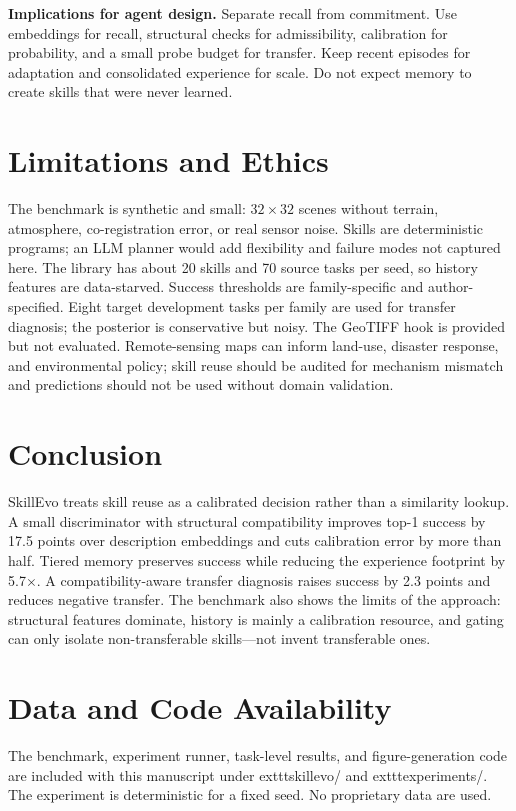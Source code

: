 \documentclass[journal]{IEEEtran}
\begin{document}
\textbf{Implications for agent design.} Separate recall from commitment. Use embeddings for recall, structural checks for admissibility, calibration for probability, and a small probe budget for transfer. Keep recent episodes for adaptation and consolidated experience for scale. Do not expect memory to create skills that were never learned.

\section{Limitations and Ethics}

The benchmark is synthetic and small: $32\times32$ scenes without terrain, atmosphere, co-registration error, or real sensor noise. Skills are deterministic programs; an LLM planner would add flexibility and failure modes not captured here. The library has about 20 skills and 70 source tasks per seed, so history features are data-starved. Success thresholds are family-specific and author-specified. Eight target development tasks per family are used for transfer diagnosis; the posterior is conservative but noisy. The GeoTIFF hook is provided but not evaluated. Remote-sensing maps can inform land-use, disaster response, and environmental policy; skill reuse should be audited for mechanism mismatch and predictions should not be used without domain validation.

\section{Conclusion}

SkillEvo treats skill reuse as a calibrated decision rather than a similarity lookup. A small discriminator with structural compatibility improves top-1 success by 17.5 points over description embeddings and cuts calibration error by more than half. Tiered memory preserves success while reducing the experience footprint by 5.7$\times$. A compatibility-aware transfer diagnosis raises success by 2.3 points and reduces negative transfer. The benchmark also shows the limits of the approach: structural features dominate, history is mainly a calibration resource, and gating can only isolate non-transferable skills---not invent transferable ones.

\section*{Data and Code Availability}
The benchmark, experiment runner, task-level results, and figure-generation code are included with this manuscript under 	exttt{skillevo/} and 	exttt{experiments/}. The experiment is deterministic for a fixed seed. No proprietary data are used.
\end{document}
